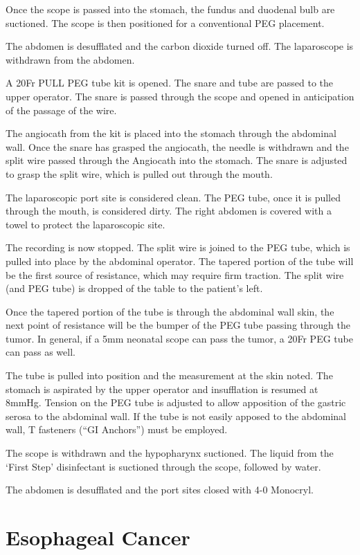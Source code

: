 \documentclass[
]{book}
\begin{document}
Once the scope is passed into the stomach, the fundus and duodenal bulb are suctioned. The scope is then positioned for a conventional PEG placement.

The abdomen is desufflated and the carbon dioxide turned off. The laparoscope is withdrawn from the abdomen.

A 20Fr PULL PEG tube kit is opened. The snare and tube are passed to the upper operator. The snare is passed through the scope and opened in anticipation of the passage of the wire.

The angiocath from the kit is placed into the stomach through the abdominal wall. Once the snare has grasped the angiocath, the needle is withdrawn and the split wire passed through the Angiocath into the stomach. The snare is adjusted to grasp the split wire, which is pulled out through the mouth.

The laparoscopic port site is considered clean. The PEG tube, once it is pulled through the mouth, is considered dirty. The right abdomen is covered with a towel to protect the laparoscopic site.

The recording is now stopped. The split wire is joined to the PEG tube, which is pulled into place by the abdominal operator. The tapered portion of the tube will be the first source of resistance, which may require firm traction. The split wire (and PEG tube) is dropped of the table to the patient's left.

Once the tapered portion of the tube is through the abdominal wall skin, the next point of resistance will be the bumper of the PEG tube passing through the tumor. In general, if a 5mm neonatal scope can pass the tumor, a 20Fr PEG tube can pass as well.

The tube is pulled into position and the measurement at the skin noted. The stomach is aspirated by the upper operator and insufflation is resumed at 8mmHg. Tension on the PEG tube is adjusted to allow apposition of the gastric serosa to the abdominal wall. If the tube is not easily apposed to the abdominal wall, T fasteners (``GI Anchors'') must be employed.

The scope is withdrawn and the hypopharynx suctioned. The liquid from the `First Step' disinfectant is suctioned through the scope, followed by water.

The abdomen is desufflated and the port sites closed with 4-0 Monocryl.

\hypertarget{part-esophageal-cancer}{%
\part*{Esophageal Cancer}\label{part-esophageal-cancer}}
\end{document}
